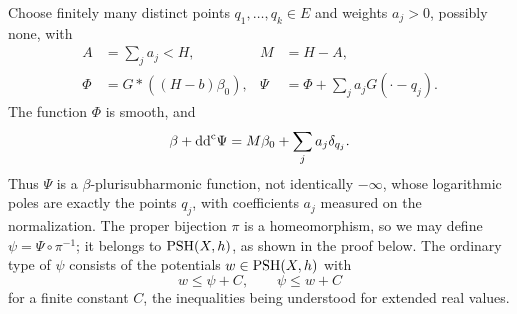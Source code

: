 Choose finitely many distinct points $q_1,\ldots,q_k\in E$ and weights $a_j>0$, possibly none, with
\[
 \begin{aligned}
 A&=\sum_j a_j<H,& M&=H-A,\\
 \Phi&=G*((H-b)\beta_0),&
 \Psi&=\Phi+\sum_j a_jG(\cdot-q_j).
 \end{aligned}
\]
The function $\Phi$ is smooth, and
\begin{equation}\label{eq:unibranch-curve-reference}
 \beta+\mathrm{dd}^{\mathrm{c}}\Psi=M\beta_0+\sum_j a_j\delta_{q_j}.
\end{equation}
Thus $\Psi$ is a $\beta$-plurisubharmonic function, not identically $-\infty$, whose logarithmic poles are exactly the points $q_j$, with coefficients $a_j$ measured on the normalization. The proper bijection $\pi$ is a homeomorphism, so we may define $\psi=\Psi\circ\pi^{-1}$; it belongs to $\mathrm{PSH}(X,h)$, as shown in the proof below. The ordinary type of $\psi$ consists of the potentials $w\in\mathrm{PSH}(X,h)$ with
\[
 w\leq\psi+C,\qquad \psi\leq w+C
\]
for a finite constant $C$, the inequalities being understood for extended real values.

